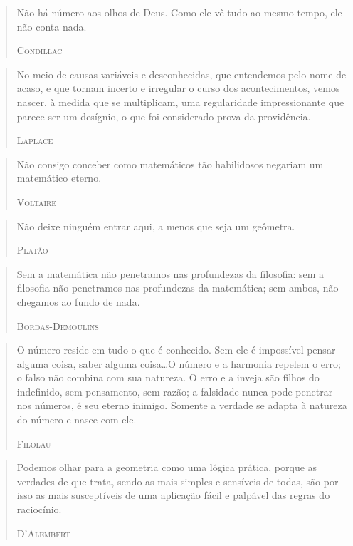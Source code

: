 \documentclass{hipatia}
\begin{document}
\begin{quote}
Não há número aos olhos de Deus. Como ele vê tudo ao mesmo tempo, ele não conta nada.

\hfill \textsc{Condillac}
\end{quote}

\begin{quote}
No meio de causas variáveis e desconhecidas, que entendemos pelo nome de acaso, e que tornam incerto e irregular o curso dos acontecimentos, vemos nascer, à medida que se multiplicam, uma regularidade impressionante que parece ser um desígnio, o que foi considerado prova da providência.

\hfill \textsc{Laplace}
\end{quote}

\begin{quote}
Não consigo conceber como matemáticos tão habilidosos negariam um matemático eterno.

\hfill \textsc{Voltaire}
\end{quote}


\begin{quote}
Não deixe ninguém entrar aqui, a menos que seja um geômetra.

\hfill \textsc{Platão}
\end{quote}

 

\begin{quote}
Sem a matemática não penetramos nas profundezas da filosofia: sem a filosofia não penetramos nas profundezas da matemática; sem ambos, não chegamos ao fundo de nada.

\hfill \textsc{Bordas-Demoulins}
\end{quote}

 
\begin{quote}
    O número reside em tudo o que é conhecido. Sem ele é impossível pensar alguma coisa, saber alguma coisa\dots  O número e a harmonia repelem o erro; o falso não combina com sua natureza. O erro e a inveja são filhos do indefinido, sem pensamento, sem razão; a falsidade nunca pode penetrar nos números, é seu eterno inimigo. Somente a verdade se adapta à natureza do número e nasce com ele.

\hfill \textsc{Filolau}
\end{quote}


\begin{quote}
Podemos olhar para a geometria como uma lógica prática, porque as verdades de que trata, sendo as mais simples e sensíveis de todas, são por isso as mais susceptíveis de uma aplicação fácil e palpável das regras do raciocínio.

\hfill \textsc{D'Alembert}
\end{quote}
\end{document}
